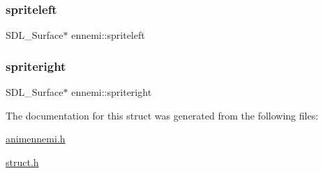 \subsubsection{\texorpdfstring{spriteleft}{spriteleft}}
{\footnotesize\ttfamily S\+D\+L\+\_\+\+Surface$\ast$ ennemi\+::spriteleft}

\mbox{\label{structennemi_a8ad9de831604958b2654c033280129f1}} 
\subsubsection{\texorpdfstring{spriteright}{spriteright}}
{\footnotesize\ttfamily S\+D\+L\+\_\+\+Surface$\ast$ ennemi\+::spriteright}



The documentation for this struct was generated from the following files\+:\begin{DoxyCompactItemize}
\item 
\hyperlink{animennemi_8h}{animennemi.\+h}\item 
\hyperlink{struct_8h}{struct.\+h}\end{DoxyCompactItemize}
